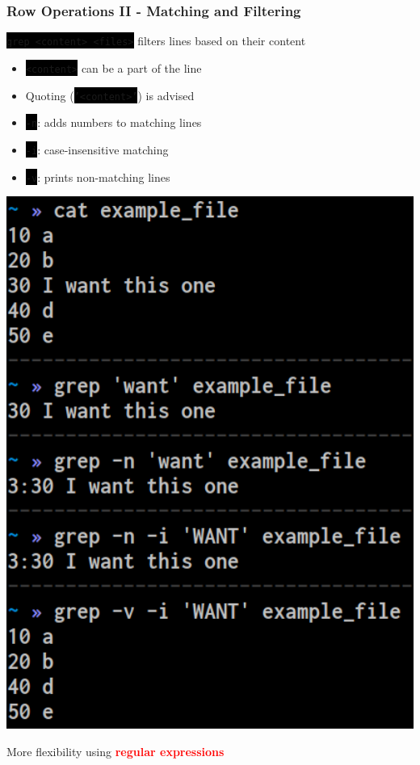 \documentclass[unknownkeysallowed, 10pt, a4 paper, handout]{beamer}
\newcommand{\focus}[1]{\textbf{\textcolor{red}{#1}}}
\newcommand{\code}[1]{\colorbox{black}{\color{green}\texttt{#1}}}
\newcommand{\sidebyside}[5]{
  \begin{minipage}{#1\textwidth}
    #2
  \end{minipage} #3 \begin{minipage}{#4\textwidth}
    #5
  \end{minipage}
}
\begin{document}
\begin{frame}
  \begin{center}
    \frametitle{Row Operations II - Matching and Filtering}

    \code{grep <content> <files>} filters lines based on their content

    \sidebyside{0.59}{
      \begin{itemize}
        \item \code{<content>} can be a part of the line
        \item Quoting (\code{'<content>'}) is advised
        \item \code{-n}: adds numbers to matching lines
        \item \code{-i}: case-insensitive matching
        \item \code{-v}: prints non-matching lines
      \end{itemize}
    }{\hfill}{0.38}{
      \begin{center}
        \includegraphics[width=1.00\textwidth]{pics/grep.png}
      \end{center}
    }

    More flexibility using \focus{regular expressions}
  \end{center}
\end{frame}
\end{document}
